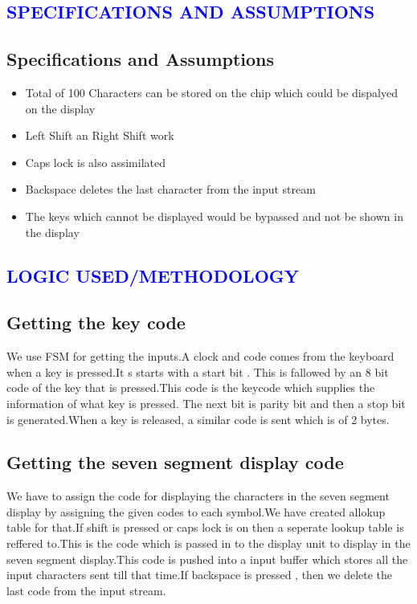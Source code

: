 \documentclass[a4paper,12pt]{report}
\begin{document}
\begin{center}
\chapter{\textcolor{blue}{SPECIFICATIONS AND ASSUMPTIONS}}
\end{center}
\section*{Specifications and Assumptions}

\begin{itemize}
\item \noindent Total of 100 Characters can be stored on the chip which could be dispalyed on the display
\item\noindent Left Shift an Right Shift work
\item\noindent Caps lock is also assimilated
\item \noindent Backspace deletes the last character from the input stream
\item The keys which cannot be displayed would be bypassed and not be shown in the display
\end{itemize}

\begin{center}
\chapter{\textcolor{blue}{LOGIC USED/METHODOLOGY}}
\end{center} 
\section*{Getting the key code}
\noindent We use FSM for getting the inputs.A clock and code comes from the keyboard when a key is pressed.It s starts with a start bit .
This is fallowed by an 8 bit code of the key that is pressed.This code is the keycode which supplies the information of what key is pressed.
The next bit is parity bit and then a stop bit is generated.When a key is released, a similar code is sent which is of 2 bytes.

\section*{Getting the seven segment display code}
\noindent We have to assign the code for displaying the characters in the seven segment display by assigning the given codes
to each symbol.We have created allokup table for that.If shift is pressed or caps lock is on then a seperate lookup table 
is reffered to.This is the code which is passed in to the display unit to display in the seven segment display.This code is 
pushed into a input buffer which stores all the input characters sent till that time.If backspace is pressed , then we delete
the last code from the input stream.\\
\end{document}
